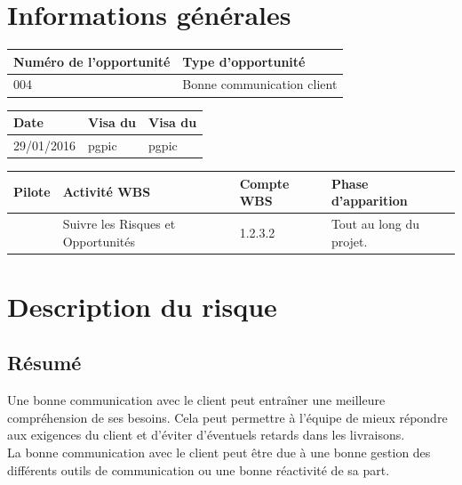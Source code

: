 \section*{Informations générales}
 
\begin{table}[h]
\centering
	\begin{tabularx}{16.8cm}{|X|X|}
	\hline
	\rowcolor{gray!40} Numéro de l'opportunité & Type d'opportunité \\
	\hline
	004 & Bonne communication client \\
	\hline
	\end{tabularx}
\end{table}

\begin{table}[h]
\centering
	\begin{tabularx}{16.8cm}{|X|X|X|}
	\hline
	 \rowcolor{gray!40} Date & Visa du \RQ & Visa du \CP \\
	\hline
	 29/01/2016 & pgpic & pgpic \\
	\hline
	\end{tabularx}
\end{table}

\begin{table}[h]
\centering
	\begin{tabularx}{16.8cm}{|X|X|X|X|}
	\hline
	\rowcolor{gray!40} Pilote & Activité WBS & Compte WBS & Phase d'apparition \\
	\hline
	 \Florian & Suivre les Risques et Opportunités & 1.2.3.2 & Tout au long du projet.\\
	\hline
	\end{tabularx}
\end{table}

\section*{Description du risque}

\subsection*{Résumé}
	Une bonne communication avec le client peut entraîner une meilleure compréhension de ses besoins. Cela peut permettre à l'équipe \PICCourt de mieux répondre aux exigences du client et d'éviter d'éventuels retards dans les livraisons. \\
        La bonne communication avec le client peut être due à une bonne gestion des différents outils de communication ou une bonne réactivité de sa part.
	
